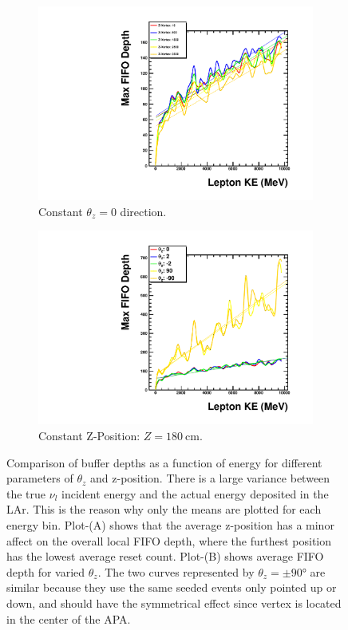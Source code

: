 \begin{figure}
\centering
\begin{subfigure}{.5\textwidth}
  \centering
  \includegraphics[width=\textwidth]{images/Const_Theta0_ASIC_lepKE_multigraph_pdg12_fhc.pdf}
  \caption{Constant $\theta_{z} = 0$ direction.}
\end{subfigure}%
\begin{subfigure}{.5\textwidth}
  \centering
  \includegraphics[width=\textwidth]{images/Const_Z180_ASIC_lepKE_multigraph_pdg12_fhc.pdf}
  \caption{Constant Z-Position: $Z = 180~$\unit{cm}.}
\end{subfigure}
\caption{Comparison of buffer depths as a function of energy for different parameters of $\theta_{z}$ and z-position.
There is a large variance between the true $\nu_{l}$ incident energy and the actual energy deposited in the LAr.
This is the reason why only the means are plotted for each energy bin.
Plot-(A) shows that the average z-position has a minor affect on the overall local FIFO depth, where the furthest position has the lowest average reset count.
Plot-(B) shows average FIFO depth for varied $\theta_{z}$.
The two curves represented by $\theta_{z} = \pm 90\unit{\degree}$ are similar because they use the same seeded events only pointed up or down, and should have the symmetrical effect since vertex is located in the center of the APA.
}
\label{fig:example_asic_energy_comparison}
\end{figure}

